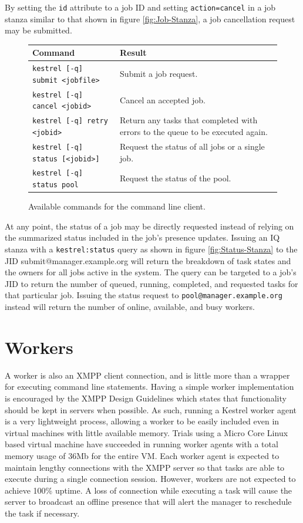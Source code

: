 By setting the \texttt{id} attribute to a job ID and setting \texttt{action=cancel}
in a job stanza similar to that shown in figure \ref{fig:Job-Stanza},
a job cancellation request may be submitted.

%
\begin{figure}
\begin{tabular}{ll}
Command  & Result \\
\hline 
\texttt{kestrel {[}-q{]} submit <jobfile>}  & Submit a job request. \\
\texttt{kestrel {[}-q{]} cancel <jobid>}  & Cancel an accepted job. \\
\texttt{kestrel {[}-q{]} retry <jobid>}  & Return any tasks that completed with errors to the queue to be executed
again.\\
\texttt{kestrel {[}-q{]} status {[}<jobid>{]}}  & Request the status of all jobs or a single job. \\
\texttt{kestrel {[}-q{]} status pool}  & Request the status of the pool. \\
\end{tabular}\caption{\label{fig:Commands} Available commands for the command line client.}

\end{figure}


At any point, the status of a job may be directly requested instead
of relying on the summarized status included in the job's presence
updates. Issuing an IQ stanza with a \texttt{kestrel:status} query
as shown in figure \ref{fig:Status-Stanza} to the JID submit@manager.example.org
will return the breakdown of task states and the owners for all jobs
active in the system. The query can be targeted to a job's JID to
return the number of queued, running, completed, and requested tasks
for that particular job. Issuing the status request to \texttt{pool@manager.example.org}
instead will return the number of online, available, and busy workers.


\section{Workers}
A worker is also an XMPP client connection, and is little more than a wrapper
for executing command line statements. Having a simple worker implementation
is encouraged by the XMPP Design Guidelines \cite{XEP-0134} which states that
functionality should be kept in servers when possible. As such, running a
Kestrel worker agent is a very lightweight process, allowing a worker to be
easily included even in virtual machines with little available memory. Trials
using a Micro Core Linux \cite{MicroCoreLinux} based virtual machine have
succeeded in running worker agents with a total memory usage of 36Mb for the
entire VM. Each worker agent is expected to maintain lengthy connections
with the XMPP server so that tasks are able to execute during a single connection
session. However, workers are not expected to achieve 100\% uptime. A loss of
connection while executing a task will cause the server to broadcast an offline
presence that will alert the manager to reschedule the task if necessary.

